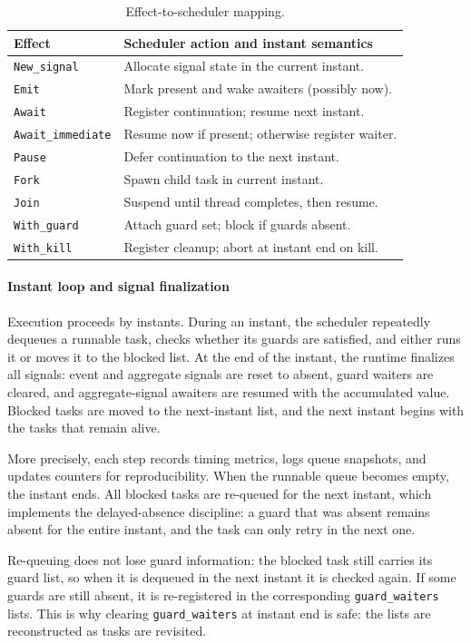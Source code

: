 \begin{table}[h]
\centering
\begin{tabularx}{\linewidth}{lY}
\hline
Effect & Scheduler action and instant semantics \\ \hline
\texttt{New\_signal} & Allocate signal state in the current instant. \\
\texttt{Emit} & Mark present and wake awaiters (possibly now). \\
\texttt{Await} & Register continuation; resume next instant. \\
\texttt{Await\_immediate} & Resume now if present; otherwise register waiter. \\
\texttt{Pause} & Defer continuation to the next instant. \\
\texttt{Fork} & Spawn child task in current instant. \\
\texttt{Join} & Suspend until thread completes, then resume. \\
\texttt{With\_guard} & Attach guard set; block if guards absent. \\
\texttt{With\_kill} & Register cleanup; abort at instant end on kill. \\ \hline
\end{tabularx}
\caption{Effect-to-scheduler mapping.}
\end{table}

\paragraph{Instant loop and signal finalization}
Execution proceeds by instants. During an instant, the scheduler repeatedly
dequeues a runnable task, checks whether its guards are satisfied, and either
runs it or moves it to the blocked list. At the end of the instant, the
runtime finalizes all signals: event and aggregate signals are reset to
absent, guard waiters are cleared, and aggregate-signal awaiters are resumed
with the accumulated value. Blocked tasks are moved to the next-instant list,
and the next instant begins with the tasks that remain alive.

More precisely, each step records timing metrics, logs queue snapshots, and
updates counters for reproducibility. When the runnable queue becomes empty,
the instant ends. All blocked tasks are re-queued for the next instant, which
implements the delayed-absence discipline: a guard that was absent remains
absent for the entire instant, and the task can only retry in the next one.

Re-queuing does not lose guard information: the blocked task still carries its
guard list, so when it is dequeued in the next instant it is checked again. If
some guards are still absent, it is re-registered in the corresponding
\texttt{guard\_waiters} lists. This is why clearing \texttt{guard\_waiters} at
instant end is safe: the lists are reconstructed as tasks are revisited.

